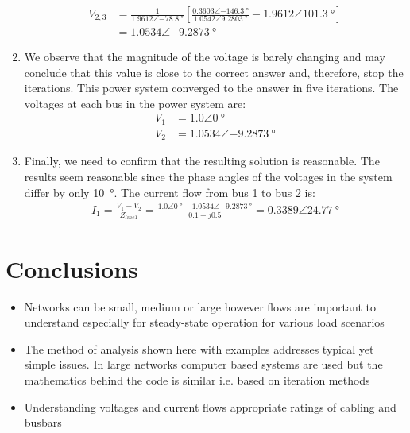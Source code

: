 \begin{enumerate}
	      \begin{align}
		      V_{2,3} & = \frac{1}{1.9612\angle\SI{-78.8}{\degree}}\left[\frac{0.3603\angle\SI{-146.3}{\degree}}{1.0542\angle\SI{9.2803}{\degree}}-1.9612\angle\SI{101.3}{\degree}\right] \\
		              & = 1.0534\angle\SI{-9.2873}{\degree}
	      \end{align}
	\item We observe that the magnitude of the voltage is barely changing and may conclude that this value is close to the correct answer and, therefore, stop the iterations. This power system converged to the answer in five iterations. The voltages at each bus in the power system are:
	      \begin{align}
		      V_1 & = 1.0\angle\SI{0}{\degree}          \\
		      V_2 & = 1.0534\angle\SI{-9.2873}{\degree}
	      \end{align}
	\item Finally, we need to confirm that the resulting solution is reasonable. The results seem reasonable since the phase angles of the voltages in the system differ by only \SI{10}{\degree}. The current flow from bus 1 to bus 2 is:
	      \begin{gather}
		      I_1 = \frac{V_1-V_2}{Z_{line1}} = \frac{1.0\angle\SI{0}{\degree} - 1.0534\angle\SI{-9.2873}{\degree}}{0.1+j0.5} = 0.3389\angle\SI{24.77}{\degree}
	      \end{gather}
\end{enumerate}
\section{Conclusions}
\begin{itemize}
	\item Networks can be small, medium or large however flows are important to understand especially for steady-state operation for various load scenarios
	\item The method of analysis shown here with examples addresses typical yet simple issues. In large networks computer based systems are used but the mathematics behind the code is similar i.e. based on iteration methods
	\item Understanding voltages and current flows appropriate ratings of cabling and busbars
\end{itemize}